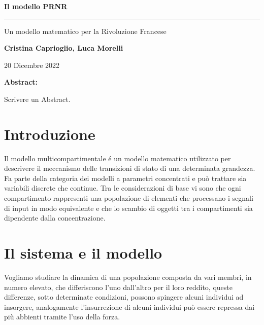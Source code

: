 \begin{center}
	\huge \textbf{Il modello PRNR}
	
	\rule{7cm}{0.4pt} 
	
	\LARGE Un modello matematico per la Rivoluzione Francese
	
	\vspace{20pt}
	
	\LARGE \textbf{Cristina Caprioglio, Luca Morelli}
	
	\vspace{5pt}
	
	\LARGE 20 Dicembre 2022
	
	\vspace{20pt}
 
	\normalsize\textbf{Abstract:}\\
\end{center}
Scrivere un Abstract.

\vspace{20pt}

\section*{Introduzione}
Il modello multicompartimentale é un modello matematico utilizzato per descrivere il meccanismo delle transizioni di stato di una determinata grandezza. Fa parte della categoria dei modelli a parametri concentrati e può trattare sia variabili discrete che continue. 
Tra le considerazioni di base vi sono che ogni compartimento rappresenti una popolazione di elementi che processano i segnali di input in modo equivalente e che lo scambio di oggetti tra i compartimenti sia dipendente dalla concentrazione. 
\section{Il sistema e il modello}
Vogliamo studiare la dinamica di una popolazione composta da vari membri, in numero elevato, che differiscono l'uno dall'altro per il loro reddito, queste differenze, sotto determinate condizioni, possono spingere alcuni individui ad insorgere, analogamente l'insurrezione di alcuni individui può essere repressa dai più abbienti tramite l'uso della forza.\\

